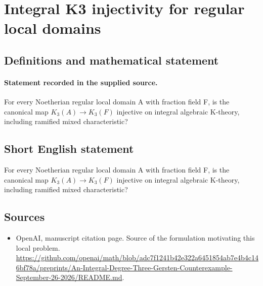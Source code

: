 \documentclass[11pt]{article}
\begin{document}
\section*{Integral K3 injectivity for regular local domains}\label{30006998}
\subsection{Definitions and mathematical statement}
\paragraph{Statement recorded in the supplied source.}
For every Noetherian regular local domain A with fraction field F, is the canonical map $K_{3}(A)\to K_{3}(F)$ injective on integral algebraic K-theory, including ramified mixed characteristic?
\subsection{Short English statement}
For every Noetherian regular local domain A with fraction field F, is the canonical map $K_{3}(A)\to K_{3}(F)$ injective on integral algebraic K-theory, including ramified mixed characteristic?
\subsection{Sources}
\begin{itemize}
\item[S1] OpenAI, manuscript citation page. Source of the formulation motivating this local problem.
\url{https://github.com/openai/math/blob/adc7f1241b42e322a6451854ab7e4b4c146bf78a/preprints/An-Integral-Degree-Three-Gersten-Counterexample-September-26-2026/README.md}.
\end{itemize}
\end{document}
